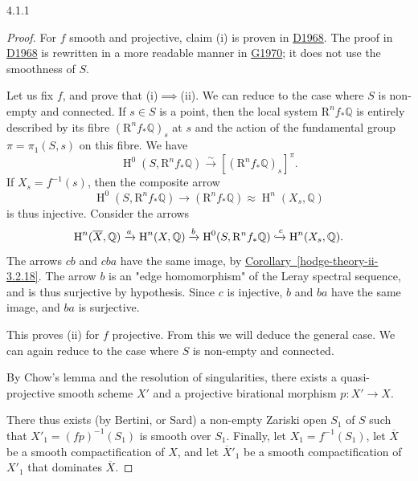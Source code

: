 \begin{theorem}{4.1.1}
\begin{enumerate}
  \end{enumerate}\begin{proof}\par{}For \(f\) smooth and projective, claim (i) is proven in \hyperref[D1968]{D1968}.
      The proof in \hyperref[D1968]{D1968} is rewritten in a more readable manner in \hyperref[G1970]{G1970};
      it does not use the smoothness of \(S\).\par{}Let us fix \(f\), and prove that (i)\(\implies \)(ii).
      We can reduce to the case where \(S\) is non-empty and connected.
      If \(s\in  S\) is a point, then the local system \(\mathrm {R}^nf_*\mathbb {Q}\) is entirely described by its fibre \((\mathrm {R}^nf_*\mathbb {Q})_s\) at \(s\) and the action of the fundamental group \(\pi =\pi _1(S,s)\) on this fibre.
      We have
      \[         \operatorname {H}^0(S,\mathrm {R}^n f_*\mathbb {Q})         \xrightarrow {\sim } [(\mathrm {R}^n f_*\mathbb {Q})_s]^\pi .       \]
      If \(X_s=f^{-1}(s)\), then the composite arrow
      \[         \operatorname {H}^0(S,\mathrm {R}^n f_*\mathbb {Q})         \to  (\mathrm {R}^n f_*\mathbb {Q})         \approx  \operatorname {H}^n(X_s,\mathbb {Q})       \]
      is thus injective.
      Consider the arrows
      \[         \operatorname {H}^n(\overline {X},\mathbb {Q})         \xrightarrow {a} \operatorname {H}^n(X,\mathbb {Q})         \xrightarrow {b} \operatorname {H}^0(S,\mathrm {R}^n f_*\mathbb {Q})         \xhookrightarrow {c} \operatorname {H}^n(X_s,\mathbb {Q}).       \]
      The arrows \(cb\) and \(cba\) have the same image, by \hyperref[hodge-theory-ii-3.2.18]{Corollary~\ref*{hodge-theory-ii-3.2.18}}.
      The arrow \(b\) is an "edge homomorphism" of the Leray spectral sequence, and is thus surjective by hypothesis.
      Since \(c\) is injective, \(b\) and \(ba\) have the same image, and \(ba\) is surjective.\par{}This proves (ii) for \(f\) projective.
      From this we will deduce the general case.
      We can again reduce to the case where \(S\) is non-empty and connected.\par{}By Chow's lemma and the resolution of singularities, there exists a quasi-projective smooth scheme \(X'\) and a projective birational morphism \(p\colon  X'\to  X\).
      
      There thus exists (by Bertini, or Sard) a non-empty Zariski open \(S_1\) of \(S\) such that \(X'_1=(fp)^{-1}(S_1)\) is smooth over \(S_1\).
      Finally, let \(X_1=f^{-1}(S_1)\), let \(\overline {X}\) be a smooth compactification of \(X\), and let \(\overline {X}'_1\) be a smooth compactification of \(X'_1\) that dominates \(\overline {X}\).


\end{proof}
\end{theorem}

